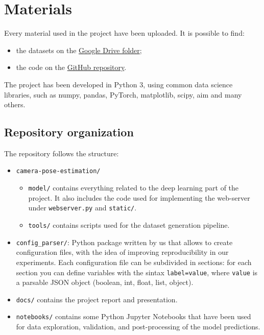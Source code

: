 \section{Materials}
Every material used in the project have been uploaded. It is possible to find:
\begin{itemize}
    \item the datasets on the \href{https://drive.google.com/drive/folders/1XHGu-9OgFi-b95f1fKpOvqIJvS_YHhO1?usp=sharing}{Google Drive folder};
    \item the code on the \href{https://github.com/fedeizzo/camera-pose-estimation}{GitHub repository}.
\end{itemize}

The project has been developed in Python 3, using common data science libraries, such as numpy, pandas, PyTorch, matplotlib, scipy, aim and many others.

\subsection{Repository organization}
The repository follows the structure:
\begin{itemize}
    \item \texttt{camera-pose-estimation/}
    \begin{itemize}
        \item \texttt{model/} contains everything related to the deep learning part of the project. It also includes the code used for implementing the web-server under \texttt{webserver.py} and \texttt{static/}.
        \item \texttt{tools/} contains scripts used for the dataset generation pipeline.
    \end{itemize}
    \item \texttt{config\_parser/}: Python package written by us that allows to create configuration files, with the idea of improving reproducibility in our experiments. Each configuration file can be subdivided in sections: for each section you can define variables with the sintax \texttt{label=value}, where \texttt{value} is a parsable JSON object (boolean, int, float, list, object).
    \item \texttt{docs/} contains the project report and presentation.
    \item \texttt{notebooks/} contains some Python Jupyter Notebooks that have been used for data exploration, validation, and post-processing of the model predictions.
\end{itemize}


